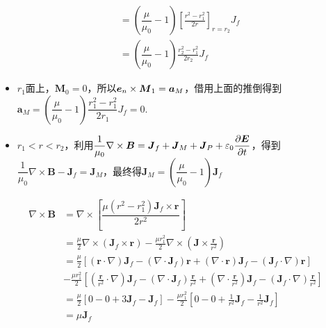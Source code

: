 \documentclass{mynote}
\begin{document}
\begin{solution}
\begin{align*}
        &= \left( \dfrac{\mu}{\mu_0} - 1\right) \left[ \frac{r^2 - r_1^2}{2r} \right]_{r=r_2} J_f \\
        &= \left( \dfrac{\mu}{\mu_0} - 1\right) \frac{r_2^2 - r_1^2}{2r_2} J_f
    \end{align*}
    \begin{itemize}
        \item $r_1$面上，$\bm{M}_0 = 0$，所以$\boldsymbol{e}_n \times \boldsymbol{M}_1 = \boldsymbol{a}_M$，借用上面的推倒得到$\bm{a}_M =  \left( \dfrac{\mu}{\mu_0} - 1\right) \dfrac{r_1^2 - r_1^2}{2r_1} J_f = 0$.
        \item $r_1 < r < r_2$，利用$\dfrac{1}{\mu_0} \nabla \times \boldsymbol{B} = \boldsymbol{J}_f + \boldsymbol{J}_M + \boldsymbol{J}_P + \varepsilon_0 \dfrac{\partial \boldsymbol{E}}{\partial t}$，得到$\dfrac{1}{\mu_0} \nabla \times \bm{B} - \bm{J}_f = \bm{J}_M$，最终得$\bm{J}_M = \left( \dfrac{\mu}{\mu_0} - 1 \right) \bm{J}_f$
    \end{itemize}
    \begin{align*}
        \nabla \times \bm{B} &= \nabla \times \left[\dfrac{\mu (r^2 - r_1^2) \bm{J}_f \times \bm{r}}{2r^2} \right] \\
        &= \frac{\mu}{2} \nabla \times (\bm{J}_f \times \bm{r}) - \frac{\mu r_1^2 }{2} \nabla \times (\bm{J} \times \frac{\bm{r}}{r^2}) \\
        &= \frac{\mu}{2} \left[ (\bm{r} \cdot \nabla)\bm{J}_f - (\nabla \cdot \bm{J}_f) \bm{r} + (\nabla \cdot \bm{r})\bm{J}_f - (\bm{J}_f \cdot \nabla)\bm{r} \right] \\
        &- \frac{\mu r_1^2}{2} \left[ (\frac{\bm{r}}{r^2} \cdot \nabla)\bm{J}_f - (\nabla \cdot \bm{J}_f) \frac{\bm{r}}{r^2} + (\nabla \cdot \frac{\bm{r}}{r^2})\bm{J}_f - (\bm{J}_f \cdot \nabla)\frac{\bm{r}}{r^2} \right] \\
        &= \frac{\mu}{2} \left[ 0-0+3\bm{J}_f - \bm{J}_f \right] - \frac{\mu r_1^2}{2} \left[ 0-0+\frac{1}{r^2}\bm{J}_f - \frac{1}{r^2}\bm{J}_f \right] \\
        &= \mu \bm{J}_f
    \end{align*}
\end{solution}
\end{document}
